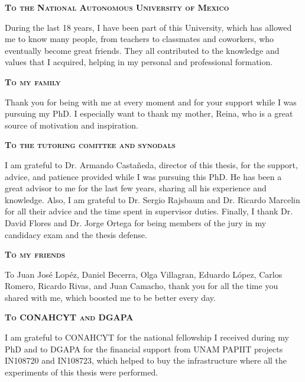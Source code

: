 {


\begin{agradecimientos}
  \textbf{\textsc{To the National Autonomous University of Mexico}}

  During the last 18 years, I have been part of this University, which has allowed me to know many people, from teachers to classmates and coworkers, who eventually become great friends. They all contributed to the knowledge and values that I acquired, helping in my personal and professional formation.

  \textbf{\textsc{To my family}}

  Thank you for being with me at every moment and for your support while I was pursuing my PhD. I especially want to thank my mother, Reina, who is a great source of motivation and inspiration.

  \textbf{\textsc{To the tutoring comittee and synodals}}

  I am grateful to Dr. Armando Castañeda, director of this thesis, for the support, advice, and patience provided while I was pursuing this PhD. He has been a great advisor to me for the last few years, sharing all his experience and knowledge. Also, I am grateful to Dr. Sergio Rajsbaum and Dr. Ricardo Marcelin for all their advice and the time spent in supervisor duties. Finally, I thank Dr. David Flores and Dr. Jorge Ortega for being members of the jury in my candidacy exam and the thesis defense.

  \textbf{\textsc{To my friends}}

  To Juan José Lopéz, Daniel Becerra, Olga Villagran, Eduardo López, Carlos Romero, Ricardo Rivas, and Juan Camacho, thank you for all the time you shared with me, which boosted me to be better every day.

  \textbf{\textsc{To CONAHCYT and DGAPA}}

  I am grateful to CONAHCYT for the national fellowship I received during my PhD and to DGAPA for the financial support from UNAM PAPIIT projects IN108720 and IN108723, which helped to buy the infrastructure where all the experiments of this thesis were performed.

\end{agradecimientos}
}
